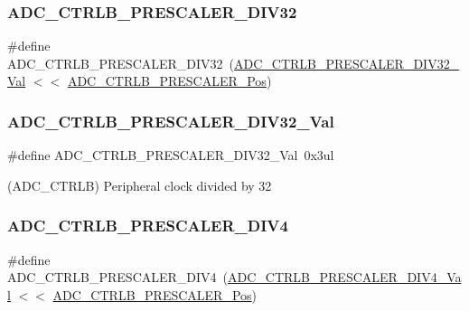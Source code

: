 \subsubsection{\texorpdfstring{ADC\_CTRLB\_PRESCALER\_DIV32}{ADC\_CTRLB\_PRESCALER\_DIV32}}
{\footnotesize\ttfamily \#define A\+D\+C\+\_\+\+C\+T\+R\+L\+B\+\_\+\+P\+R\+E\+S\+C\+A\+L\+E\+R\+\_\+\+D\+I\+V32~(\mbox{\hyperlink{group___s_a_m_d21___a_d_c_gafd19aa73d07682c0d5d7fdda8ab230b5}{A\+D\+C\+\_\+\+C\+T\+R\+L\+B\+\_\+\+P\+R\+E\+S\+C\+A\+L\+E\+R\+\_\+\+D\+I\+V32\+\_\+\+Val}} $<$$<$ \mbox{\hyperlink{group___s_a_m_d21___a_d_c_ga67bbef18402c0d73dcc1698fa185ab76}{A\+D\+C\+\_\+\+C\+T\+R\+L\+B\+\_\+\+P\+R\+E\+S\+C\+A\+L\+E\+R\+\_\+\+Pos}})}

\mbox{\label{group___s_a_m_d21___a_d_c_gafd19aa73d07682c0d5d7fdda8ab230b5}} 
\subsubsection{\texorpdfstring{ADC\_CTRLB\_PRESCALER\_DIV32\_Val}{ADC\_CTRLB\_PRESCALER\_DIV32\_Val}}
{\footnotesize\ttfamily \#define A\+D\+C\+\_\+\+C\+T\+R\+L\+B\+\_\+\+P\+R\+E\+S\+C\+A\+L\+E\+R\+\_\+\+D\+I\+V32\+\_\+\+Val~0x3ul}



(A\+D\+C\+\_\+\+C\+T\+R\+LB) Peripheral clock divided by 32 

\mbox{\label{group___s_a_m_d21___a_d_c_ga914326a1bec32859ed4b60ad4125eaf6}} 
\subsubsection{\texorpdfstring{ADC\_CTRLB\_PRESCALER\_DIV4}{ADC\_CTRLB\_PRESCALER\_DIV4}}
{\footnotesize\ttfamily \#define A\+D\+C\+\_\+\+C\+T\+R\+L\+B\+\_\+\+P\+R\+E\+S\+C\+A\+L\+E\+R\+\_\+\+D\+I\+V4~(\mbox{\hyperlink{group___s_a_m_d21___a_d_c_gaba2eeed7d542b9de1eb9a50e78acd772}{A\+D\+C\+\_\+\+C\+T\+R\+L\+B\+\_\+\+P\+R\+E\+S\+C\+A\+L\+E\+R\+\_\+\+D\+I\+V4\+\_\+\+Val}}  $<$$<$ \mbox{\hyperlink{group___s_a_m_d21___a_d_c_ga67bbef18402c0d73dcc1698fa185ab76}{A\+D\+C\+\_\+\+C\+T\+R\+L\+B\+\_\+\+P\+R\+E\+S\+C\+A\+L\+E\+R\+\_\+\+Pos}})}

